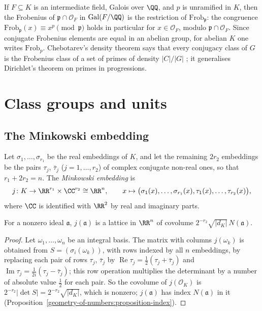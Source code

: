 \begin{remark}\label{algebraic-number-theory:remark-frobenius-restriction}
If $F \subseteq K$ is an intermediate field, Galois over $\QQ$, and $p$ is unramified in $K$, then the Frobenius of $\mathfrak{p} \cap \mathcal{O}_F$ in $\mathrm{Gal}(F/\QQ)$ is the restriction of
$\mathrm{Frob}_\mathfrak{p}$: the congruence $\mathrm{Frob}_\mathfrak{p}(x) \equiv x^p \pmod{\mathfrak{p}}$ holds in particular for $x \in \mathcal{O}_F$, modulo $\mathfrak{p} \cap \mathcal{O}_F$. Since conjugate Frobenius
elements are equal in an abelian group, for abelian $K$ one writes $\mathrm{Frob}_p$. Chebotarev's density theorem says that every conjugacy class of $G$ is the Frobenius class of a set of primes of
density $|C|/|G|$ \cite[Chapter VII, Theorem 13.4]{neukirch-ant}; it generalises Dirichlet's theorem on primes in progressions.
\end{remark}

\section{Class groups and units}\label{algebraic-number-theory:section-class-groups-and-units}

\subsection{The Minkowski embedding}\label{algebraic-number-theory:subsection-minkowski}

Let $\sigma_1, \dots, \sigma_{r_1}$ be the real embeddings of $K$, and let the remaining $2r_2$ embeddings be the pairs $\tau_j$, $\bar\tau_j$ ($j = 1, \dots, r_2$) of complex conjugate non-real ones, so
that $r_1 + 2r_2 = n$. The \emph{Minkowski embedding} is
\[
j \colon K \to \RR^{r_1} \times \CC^{r_2} \cong \RR^n, \qquad x \mapsto \bigl(\sigma_1(x), \dots, \sigma_{r_1}(x), \tau_1(x), \dots, \tau_{r_2}(x)\bigr),
\]
where $\CC$ is identified with $\RR^2$ by real and imaginary parts.

\begin{proposition}\label{algebraic-number-theory:proposition-minkowski-lattice}
For a nonzero ideal $\mathfrak{a}$, $j(\mathfrak{a})$ is a lattice in $\RR^n$ of covolume $2^{-r_2}\sqrt{|d_K|}\,N(\mathfrak{a})$.
\end{proposition}

\begin{proof}
Let $\omega_1, \dots, \omega_n$ be an integral basis. The matrix with columns $j(\omega_k)$ is obtained from $S = (\sigma_i(\omega_k))$, with rows indexed by all $n$ embeddings, by replacing each pair of
rows $\tau_j$, $\bar\tau_j$ by $\operatorname{Re}\tau_j = \frac12(\tau_j + \bar\tau_j)$ and $\operatorname{Im}\tau_j = \frac{1}{2i}(\tau_j - \bar\tau_j)$; this row operation multiplies the determinant by a number of
absolute value $\frac12$ for each pair. So the covolume of $j(\mathcal{O}_K)$ is $2^{-r_2}|\det S| = 2^{-r_2}\sqrt{|d_K|}$, which is nonzero; $j(\mathfrak{a})$ has index $N(\mathfrak{a})$ in it
(Proposition~\ref{geometry-of-numbers:proposition-index}).
\end{proof}

